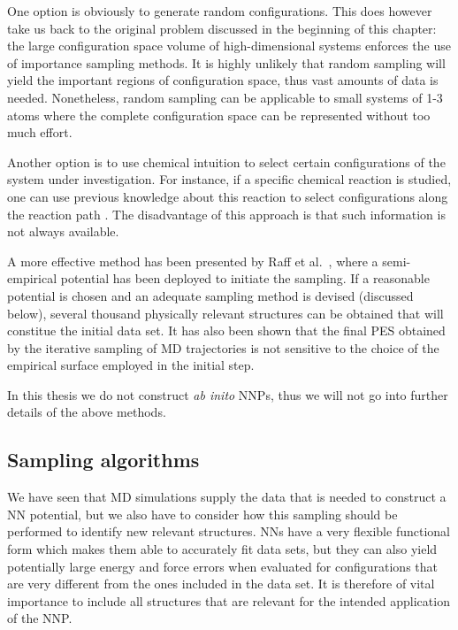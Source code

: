 \documentclass[twoside,english]{uiofysmaster}
\begin{document}
One option is obviously to generate random configurations. This does however take us back to the 
original problem discussed in the beginning of this chapter: the large configuration space volume of
high-dimensional systems enforces the use of importance sampling methods. 
It is highly unlikely that random sampling will yield the important regions of configuration space, thus 
vast amounts of data is needed. Nonetheless, random sampling can be applicable to small systems of 1-3 atoms where
the complete configuration space can be represented without too much effort. 

Another option is to use chemical intuition to select certain configurations of 
the system under investigation. 
For instance, if a specific chemical reaction is studied, one can use previous knowledge about this reaction to 
select configurations along the reaction path \cite{Ischtwan94}. The disadvantage of this approach is that
such information is not always available. 

A more effective method has been presented by Raff et al.\ \cite{Raff05}, where a semi-empirical
potential has been deployed to initiate the sampling. If a reasonable potential is chosen and an adequate
sampling method is devised (discussed below), several thousand physically relevant structures can be obtained
that will constitue the initial data set. It has also been shown \cite{Raff05} that the final PES obtained 
by the iterative sampling of MD trajectories is not sensitive to the choice of the empirical surface employed 
in the initial step. 

In this thesis we do not construct \textit{ab inito} NNPs, thus we will not go into further details
of the above methods. 

\subsection{Sampling algorithms} \label{sec:samplingAlgorithms}
We have seen that MD simulations supply the data that is needed to construct a NN potential, but we 
also have to consider how this sampling should be performed to identify new relevant structures.
NNs have a very flexible functional form which makes them able to accurately fit data sets, 
but they can also yield potentially large energy and force errors 
when evaluated for configurations that are very different from the ones included in the data set.
It is therefore of vital importance to include all structures that are relevant for the intended
application of the NNP.
\end{document}
